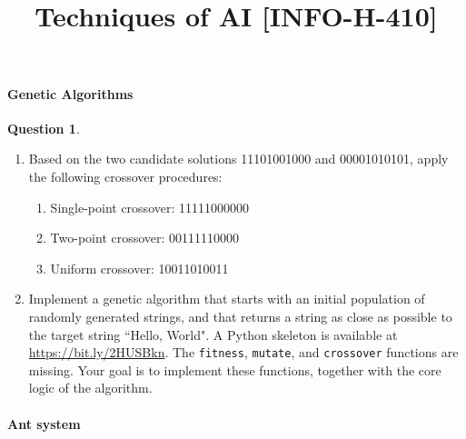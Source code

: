 \documentclass[11pt,a4paper]{article}
\date{\vspace{-1.7cm}\version}
\title{\vspace{-2cm} \tpnumber \\ Techniques of AI [INFO-H-410] \ifthenelse{\boolean{corrige}}{Correction}{}}
\theoremstyle{definition}%
\newtheorem{Q}{Question}[] %
\begin{document}

\maketitle

\paragraph{Genetic Algorithms}
\begin{Q}

\begin{enumerate}
\item Based on the two candidate solutions 11101001000 and 
00001010101, apply the following crossover procedures:
\begin{enumerate}
	\item Single-point crossover: 11111000000
	\item Two-point crossover: 	  00111110000
	\item Uniform crossover: 	  10011010011
\end{enumerate}
\item Implement a genetic algorithm that starts with an initial
population of randomly generated strings, and that returns a string 
as close as possible to the target string ``Hello, World". A Python 
skeleton is available at  \url{https://bit.ly/2HUSBkn}. The 
\texttt{fitness}, \texttt{mutate}, 
and \texttt{crossover} functions are missing. Your goal is to 
implement these functions, together with the core logic of the 
algorithm.  
\end{enumerate}

\end{Q}

\paragraph{Ant system}
\end{document}
